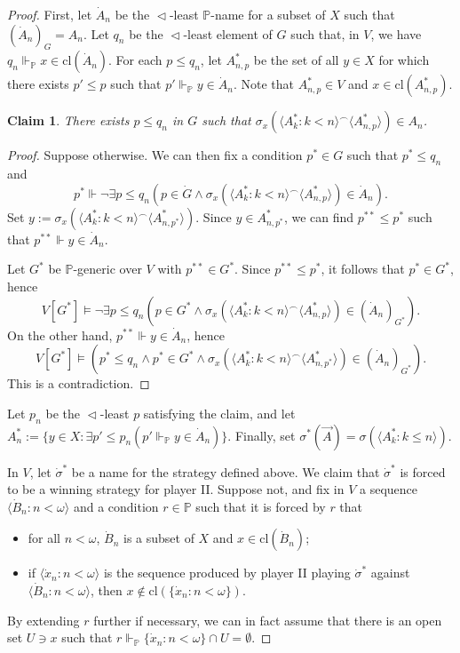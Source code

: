 \documentclass{amsart}
\newtheorem{claim}[theorem]{Claim}
\theoremstyle{definition}
\newcommand{\bb}{\mathbb}
\renewcommand{\P}{\bb{P}}
\begin{document}
\begin{proof}
  First, let $\dot{A}_n$ be the $\vartriangleleft$-least $\P$-name for a subset of $X$ such that 
  $(\dot{A}_n)_G = A_n$. Let $q_n$ be the $\vartriangleleft$-least element of $G$ such that, in 
  $V$, we have $q_n \Vdash_{\P} x \in \mathrm{cl}(\dot{A}_n)$. For each $p \leq q_n$, 
  let $A^*_{n,p}$ be the set of all $y \in X$ for which there exists $p' \leq p$ such 
  that $p' \Vdash_{\P} y \in \dot{A}_n$. Note that $A^*_{n,p} \in V$ and 
  $x \in \mathrm{cl}(A^*_{n,p})$.
  
\begin{claim}\label{4.2}
There exists $p \leq q_n$ in $G$ such that 
  $\sigma_x(\langle A^*_k :k < n \rangle ^\frown \langle A^*_{n,p}\rangle) \in A_n$.
\end{claim} 

\begin{proof}
Suppose otherwise. We can then fix a condition $p^*\in G$ such that $p^*\le q_n$ and
\[
p^*\Vdash \neg\exists p\le q_n \left(p\in\dot G\wedge \sigma_x(\langle A^*_k :k < n \rangle ^\frown \langle A^*_{n,p}\rangle) \in \dot{A}_n\right).
\]
Set $y:=\sigma_x(\langle A^*_k :k < n \rangle ^\frown \langle A^*_{n,p^*}\rangle)$. Since $y\in A^*_{n,p^*}$, we can find $p^{**}\le p^*$ such that $p^{**}\Vdash y\in\dot A_n$.

Let $G^*$ be $\P$-generic over $V$ with $p^{**}\in G^*$. Since $p^{**}\le p^*$, it follows that $p^*\in G^*$, hence
\[
V[G^*]\models \neg\exists p\le q_n \left(p\in G^*\wedge \sigma_x(\langle A_k^*:k<n\rangle^\frown \langle A_{n,p}^*\rangle)\in (\dot{A}_n)_{G^*}\right).
\]
On the other hand, $p^{**}\Vdash y\in \dot A_n$, hence
\[
V[G^*]\models \left(p^*\le q_n \wedge p^*\in G^*\wedge \sigma_x(\langle A_k^*:k<n\rangle^\frown \langle A_{n,p^*}^*\rangle)\in (\dot{A}_n)_{G^*}\right).
\]
This is a contradiction.
\end{proof}

Let $p_n$ be the $\vartriangleleft$-least $p$ satisfying the claim, and let 
  $A^*_n := \{y \in X :\exists p' \leq p_n  (p' \Vdash_{\P} y \in \dot{A}_n)\}$. 
  Finally, set $\sigma^*(\vec{A}) = \sigma(\langle A^*_k :k \leq n \rangle)$.
  
  In $V$, let $\dot{\sigma}^*$ be a name for the strategy defined above. 
  We claim that $\dot{\sigma}^*$ is forced to be a winning strategy for player II. 
  Suppose not, and fix in $V$ a sequence $\langle \dot{B}_n :n < \omega \rangle$ 
  and a condition $r \in \P$ such that it is forced by $r$ that
  \begin{itemize}
    \item for all $n < \omega$, $\dot{B}_n$ is a subset of $X$ and $x \in 
    \mathrm{cl}(\dot{B}_n)$;
    \item if $\langle \dot{x}_n :n < \omega \rangle$ is the sequence produced by player II 
    playing $\dot{\sigma}^*$ against $\langle \dot{B}_n :n < \omega \rangle$, 
    then $x \notin \mathrm{cl}(\{\dot{x}_n :n < \omega\})$.
  \end{itemize}
  By extending $r$ further if necessary, we can in fact assume that there is an open set 
  $U \ni x$ such that $r \Vdash_{\P} \{\dot{x}_n :n < \omega\} \cap U = \emptyset$.
  

\end{proof}
\end{document}
